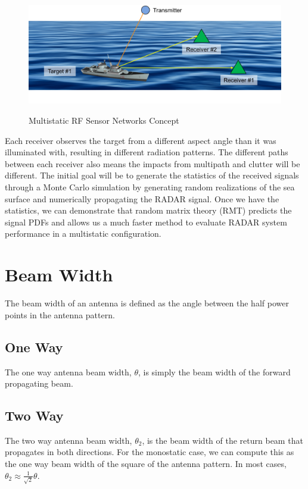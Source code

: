 \begin{figure}[H]
  \begin{center}
\includegraphics[width=5in]{../media/multistatic/ms_rf_concept.png}
  \end{center}
  \renewcommand{\baselinestretch}{1} \small\normalsize
  \begin{quote}
    \caption[Multistatic RF Sensor Networks Concept]{Multistatic RF Sensor Networks Concept\label{ms_fig:1}}
  \end{quote}
\end{figure}
\renewcommand{\baselinestretch}{2} \small\normalsize
Each receiver observes the target from a different aspect angle than it was illuminated with, resulting in different radiation patterns. The different paths between each receiver also means the impacts from multipath and clutter will be different. The initial goal will be to generate the statistics of the received signals through a Monte Carlo simulation by generating random realizations of the sea surface and numerically propagating the RADAR signal. Once we have the statistics, we can demonstrate that random matrix theory (RMT) predicts the signal PDFs and allows us a much faster method to evaluate RADAR system performance in a multistatic configuration. 

\section{Beam Width}
The beam width of an antenna is defined as the angle between the half power points in the antenna pattern.

\subsection{One Way}
The one way antenna beam width, $\theta$, is simply the beam width of the forward propagating beam.

\subsection{Two Way}
The two way antenna beam width, $\theta_2$, is the beam width of the return beam that propagates in both directions. For the monostatic case, we can compute this as the one way beam width of the square of the antenna pattern. In most cases, $\theta_2 \approx \frac{1}{\sqrt{2}}\theta$.

